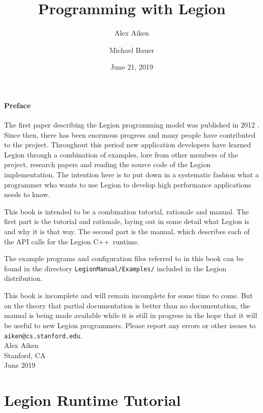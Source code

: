 \documentclass[11pt]{book}
\newcommand{\legionbook}[1]{{\tt LegionManual/Examples/#1}}
\newcommand{\Cpp}{C++}
\begin{document}
\title{Programming with Legion}
\author{Alex Aiken \and Michael Bauer}
\date{June 21, 2019}
\maketitle

\subsection*{Preface}

The first paper describing the Legion programming model
was published in 2012 \cite{Legion12}.  Since then, there has been
enormous progress and many people have contributed to
the project.  Throughout this period new application developers have
learned Legion through a combination of examples, lore from other
members of the project, research papers and reading the source code of
the Legion implementation.  The intention here is to put down in 
a systematic fashion what a programmer who wants to use
Legion to develop high performance applications needs to know.

This book is intended to be a combination tutorial, rationale and
manual.  The first part is the tutorial and rationale, laying out in some
detail what Legion is and why it is that way.  The second part is the manual, which describes
each of the API calls for the Legion \Cpp\ runtime.

The example programs and configuration files referred to in this book can be found in the directory
\legionbook{} included in the Legion distribution.

This book is incomplete and will remain incomplete for
some time to come.  But on the theory that partial documentation is better than no
documentation, the manual is being made available while it is
still in progress in the hope that it will be useful to new Legion
programmers.  Please report any errors or other issues to {\tt
  aiken@cs.stanford.edu}. \\[2in] Alex Aiken\\ Stanford, CA \\ June
2019

\tableofcontents

\part{Legion Runtime Tutorial}












\end{document}
